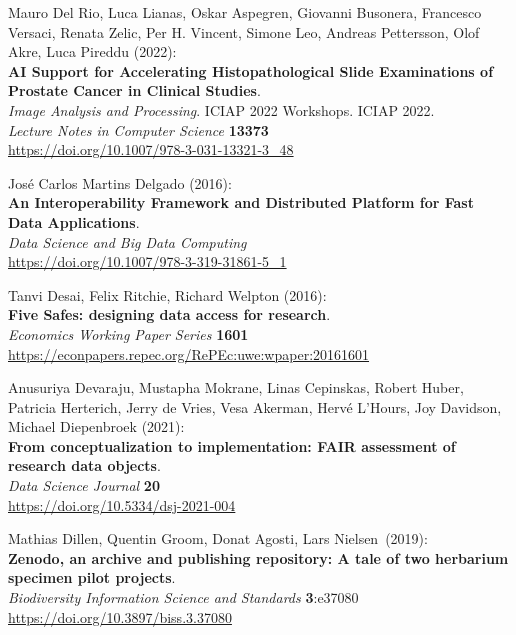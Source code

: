 \begin{thebibliography}{9}
Mauro Del Rio, Luca Lianas, Oskar Aspegren, Giovanni Busonera, Francesco Versaci, Renata Zelic, Per H. Vincent, Simone Leo, Andreas Pettersson, Olof Akre, Luca Pireddu (2022):\\
\textbf{AI Support for Accelerating Histopathological Slide Examinations of Prostate Cancer in Clinical Studies}.\\
\emph{Image Analysis and Processing}. ICIAP 2022 Workshops. ICIAP 2022. \\
\emph{Lecture Notes in Computer Science} \textbf{13373}\\
\url{https://doi.org/10.1007/978-3-031-13321-3_48}

José Carlos Martins Delgado (2016): \\
\textbf{An Interoperability Framework and Distributed Platform for Fast Data Applications}.\\
\emph{Data Science and Big Data Computing} \\
\url{https://doi.org/10.1007/978-3-319-31861-5_1}

Tanvi Desai, Felix Ritchie, Richard Welpton (2016):\\
\textbf{Five Safes: designing data access for research}.\\
\emph{Economics Working Paper Series} \textbf{1601}\\
\url{https://econpapers.repec.org/RePEc:uwe:wpaper:20161601}

Anusuriya Devaraju, Mustapha Mokrane, Linas Cepinskas, Robert Huber,
Patricia Herterich, Jerry de Vries, Vesa Akerman, Hervé L'Hours, Joy
Davidson, Michael Diepenbroek (2021): \\
\textbf{From conceptualization to implementation: FAIR assessment of research data objects}. \\
\emph{Data Science Journal} \textbf{20} \\
\url{https://doi.org/10.5334/dsj-2021-004}

Mathias Dillen, Quentin Groom, Donat Agosti, Lars Nielsen~(2019):\\
\textbf{Zenodo, an archive and publishing repository: A tale of two
herbarium specimen pilot projects}.\\
\emph{Biodiversity Information Science and Standards} \textbf{3}:e37080\\
\url{https://doi.org/10.3897/biss.3.37080}


\end{thebibliography}
